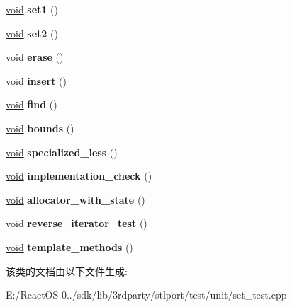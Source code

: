 \begin{DoxyCompactItemize}
\item 
\mbox{\label{class_set_test_aada161149e4074086e3f7cf48070a2a6}} 
\hyperlink{interfacevoid}{void} {\bfseries set1} ()
\item 
\mbox{\label{class_set_test_ad1f457f6f965970e6ae4a508a510dae4}} 
\hyperlink{interfacevoid}{void} {\bfseries set2} ()
\item 
\mbox{\label{class_set_test_a4e9874e0e3bff08ebfab1735b36b7ceb}} 
\hyperlink{interfacevoid}{void} {\bfseries erase} ()
\item 
\mbox{\label{class_set_test_a6443bffc9698dab5d1c81a67706017c7}} 
\hyperlink{interfacevoid}{void} {\bfseries insert} ()
\item 
\mbox{\label{class_set_test_a476a24cb00a4772a5de37944bc6652e6}} 
\hyperlink{interfacevoid}{void} {\bfseries find} ()
\item 
\mbox{\label{class_set_test_a4cea37c54186dcf248a7c46b2736d20b}} 
\hyperlink{interfacevoid}{void} {\bfseries bounds} ()
\item 
\mbox{\label{class_set_test_ad5c2447e089e48beec5c8b2627537fed}} 
\hyperlink{interfacevoid}{void} {\bfseries specialized\+\_\+less} ()
\item 
\mbox{\label{class_set_test_a0d3a87bd267cacd8632f2df2c756ef0d}} 
\hyperlink{interfacevoid}{void} {\bfseries implementation\+\_\+check} ()
\item 
\mbox{\label{class_set_test_a42b6f92127f9a73767def7716a4da3de}} 
\hyperlink{interfacevoid}{void} {\bfseries allocator\+\_\+with\+\_\+state} ()
\item 
\mbox{\label{class_set_test_ae826465f79d0e997fcb0056a2a6fd9ac}} 
\hyperlink{interfacevoid}{void} {\bfseries reverse\+\_\+iterator\+\_\+test} ()
\item 
\mbox{\label{class_set_test_a07a39b58b610b3657dbbc08be6105928}} 
\hyperlink{interfacevoid}{void} {\bfseries template\+\_\+methods} ()
\end{DoxyCompactItemize}


该类的文档由以下文件生成\+:\begin{DoxyCompactItemize}
\item 
E\+:/\+React\+O\+S-\/0../sdk/lib/3rdparty/stlport/test/unit/set\+\_\+test.\+cpp\end{DoxyCompactItemize}
